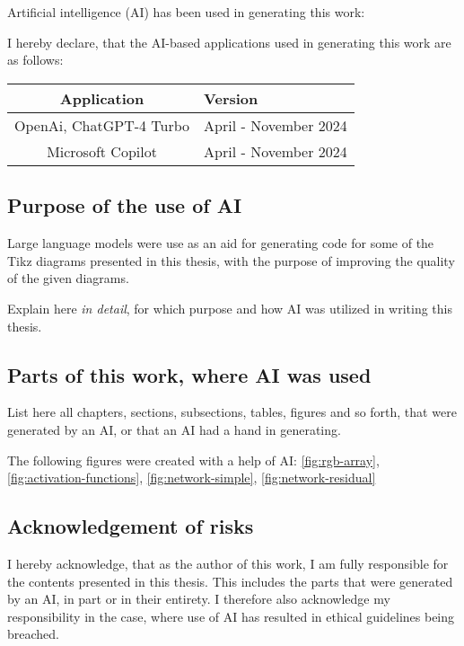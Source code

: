 \clearpage
\chapter*{\@aidisclaimertitle}
Artificial intelligence (AI) has been used in generating this work:


I hereby declare, that the AI-based applications used in generating this work are as follows:

\begin{center}
    \begin{tabular}{c|l}
        \toprule
        \textbf{Application} & \textbf{Version} \\
        \midrule
        OpenAi, ChatGPT-4 Turbo & April - November 2024 \\
        Microsoft Copilot & April - November 2024 \\
        \bottomrule
    \end{tabular}
\end{center}

\section*{Purpose of the use of AI}

Large language models were use as an aid for generating code for some of the Tikz diagrams presented in this thesis, with the purpose of improving the quality of the given diagrams.

Explain here \emph{in detail}, for which purpose and how AI was utilized in writing this thesis.

\section*{Parts of this work, where AI was used}

List here all chapters, sections, subsections, tables, figures and so forth,
that were generated by an AI, or that an AI had a hand in generating.

The following figures were created with a help of AI: \ref{fig:rgb-array}, \ref{fig:activation-functions}, \ref{fig:network-simple}, \ref{fig:network-residual}

\section*{Acknowledgement of risks}

I hereby acknowledge, that as the author of this work, I am fully
responsible for the contents presented in this thesis. This includes
the parts that were generated by an AI, in part or in their entirety. I
therefore also acknowledge my responsibility in the case, where use of
AI has resulted in ethical guidelines being breached.

\clearpage
